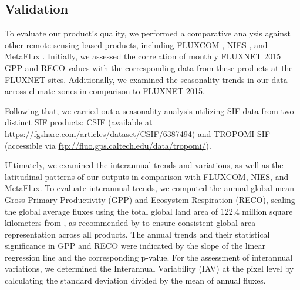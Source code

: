 \subsection{Validation}
To evaluate our product's quality, we performed a comparative analysis against other remote sensing-based products, including FLUXCOM \citep{jung2019fluxcom}, NIES \citep{zeng2020global}, and MetaFlux \citep{nathaniel2023metaflux}. Initially, we assessed the correlation of monthly FLUXNET 2015 GPP and RECO values with the corresponding data from these products at the FLUXNET sites. Additionally, we examined the seasonality trends in our data across climate zones in comparison to FLUXNET 2015. \par

Following that, we carried out a seasonality analysis utilizing SIF data from two distinct SIF products: CSIF \citep{zhang2018global} (available at \url{https://fgshare.com/articles/dataset/CSIF/6387494}) and TROPOMI SIF \citep{kohler2018global} (accessible via \url{ftp://fluo.gps.caltech.edu/data/tropomi/}).\par

Ultimately, we examined the interannual trends and variations, as well as the latitudinal patterns of our outputs in comparison with FLUXCOM, NIES, and MetaFlux. To evaluate interannual trends, we computed the annual global mean Gross Primary Productivity (GPP) and Ecosystem Respiration (RECO), scaling the global average fluxes using the total global land area of 122.4 million square kilometers from \citep{friedl2010modis}, as recommended by \citep{jung2020scaling} to ensure consistent global area representation across all products. The annual trends and their statistical significance in GPP and RECO were indicated by the slope of the linear regression line and the corresponding p-value. For the assessment of interannual variations, we determined the Interannual Variability (IAV) at the pixel level by calculating the standard deviation divided by the mean of annual fluxes.\par

